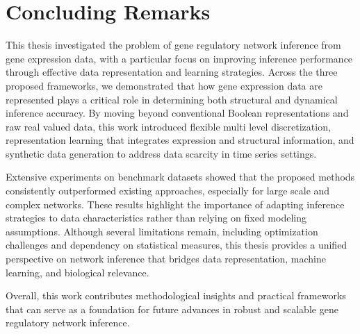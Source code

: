\section{Concluding Remarks}
This thesis investigated the problem of gene regulatory network inference from gene expression data, with a particular focus on improving inference performance through effective data representation and learning strategies. Across the three proposed frameworks, we demonstrated that how gene expression data are represented plays a critical role in determining both structural and dynamical inference accuracy. By moving beyond conventional Boolean representations and raw real valued data, this work introduced flexible multi level discretization, representation learning that integrates expression and structural information, and synthetic data generation to address data scarcity in time series settings.

Extensive experiments on benchmark datasets showed that the proposed methods consistently outperformed existing approaches, especially for large scale and complex networks. These results highlight the importance of adapting inference strategies to data characteristics rather than relying on fixed modeling assumptions. Although several limitations remain, including optimization challenges and dependency on statistical measures, this thesis provides a unified perspective on network inference that bridges data representation, machine learning, and biological relevance.

Overall, this work contributes methodological insights and practical frameworks that can serve as a foundation for future advances in robust and scalable gene regulatory network inference.





